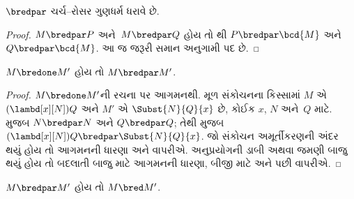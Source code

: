 \begin{thm}
  $\bredpar$ ચર્ચ--રોસર ગુણધર્મ ધરાવે છે.
\end{thm}

\begin{proof}
  $M\bredpar P$ અને~$M\bredpar Q$ હોય તો
  થી $P\bredpar\bcd{M}$ અને
  $Q\bredpar\bcd{M}$. આ જ જરૂરી સમાન અનુગામી પદ છે.
\end{proof}
\endgroup

\begingroup
\makeatletter{}\makeatother


\label{guunit:OLP-0370}


\begin{lem}
  $M \bredone M'$ હોય તો $M \bredpar M'$.
\end{lem}
\begin{proof}
  $M \bredone M'$ની રચના પર આગમનથી. મૂળ સંકોચનના
  કિસ્સામાં $M$ એ $(\lambd[x][N])Q$ અને
  $M'$ એ $\Subst{N}{Q}{x}$ છે, કોઈક
  $x$, $N$ અને~$Q$ માટે. 
  મુજબ $N \bredpar N$ અને $Q \bredpar Q$;
  તેથી 
  મુજબ $(\lambd[x][N])Q \bredpar
  \Subst{N}{Q}{x}$. જો સંકોચન અમૂર્તીકરણની અંદર
  થયું હોય તો આગમનની ધારણા અને
   વાપરીએ. અનુપ્રયોગની
  ડાબી અથવા જમણી બાજુ થયું હોય તો બદલાતી બાજુ
  માટે આગમનની ધારણા, બીજી માટે
   અને પછી
   વાપરીએ.
\end{proof}

\begin{lem}
  $M \bredpar M'$ હોય તો $M \bred M'$.
\end{lem}

